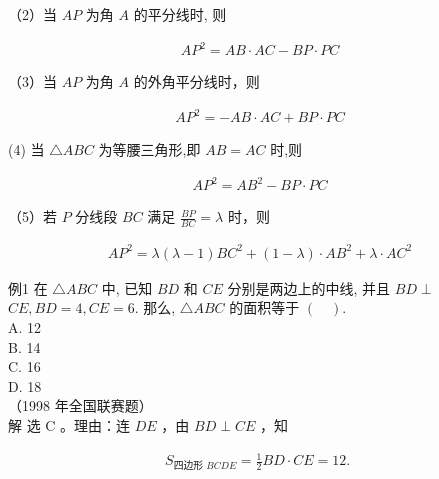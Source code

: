 \documentclass[10pt]{article}
\begin{document}
（2）当 $A P$ 为角 $A$ 的平分线时, 则

\begin{align*}
A P^{2}=A B \cdot A C-B P \cdot P C \tag{2-12}
\end{align*}

（3）当 $A P$ 为角 $A$ 的外角平分线时，则

\begin{align*}
A P^{2}=-A B \cdot A C+B P \cdot P C \tag{2-13}
\end{align*}

(4) 当 $\triangle A B C$ 为等腰三角形,即 $A B=A C$ 时,则

\begin{align*}
A P^{2}=A B^{2}-B P \cdot P C \tag{2-14}
\end{align*}

（5）若 $P$ 分线段 $B C$ 满足 $\frac{B P}{B C}=\lambda$ 时，则

\begin{align*}
A P^{2}=\lambda(\lambda-1) B C^{2}+(1-\lambda) \cdot A B^{2}+\lambda \cdot A C^{2} \tag{2-15}
\end{align*}

例1 在 $\triangle A B C$ 中, 已知 $B D$ 和 $C E$ 分别是两边上的中线, 并且 $B D \perp$ $C E, B D=4, C E=6$. 那么, $\triangle A B C$ 的面积等于 $(\quad)$.\\
A. 12\\
B. 14\\
C. 16\\
D. 18\\
（1998 年全国联赛题）\\
解 选 C 。理由：连 $D E$ ，由 $B D \perp C E$ ，知

\begin{align*}
S_{\text {四边形 } B C D E}=\frac{1}{2} B D \cdot C E=12 \text {. }
\end{align*}
\end{document}

